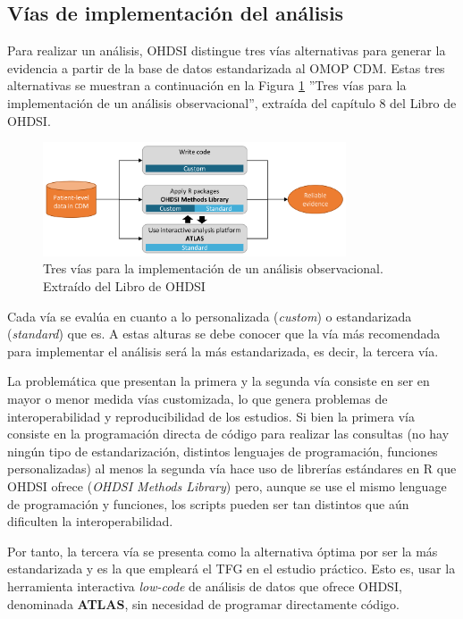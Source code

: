 \subsection{Vías de implementación del análisis} \label{subsec:05vias}

Para realizar un análisis, OHDSI distingue tres vías alternativas para generar la evidencia a partir de la base de datos estandarizada al OMOP CDM. Estas tres alternativas se muestran a continuación en la Figura \ref{fig:analysisImplementations} ''Tres vías para la implementación de un análisis observacional'', extraída del capítulo 8 del Libro de OHDSI.

\begin{figure}[H]
    \centering
    \includegraphics[width=0.80\textwidth]{figures/analysisImplementations.png}
     \caption{Tres vías para la implementación de un análisis observacional. Extraído del Libro de OHDSI \cite{OHDSIbook}}
    \label{fig:analysisImplementations}
\end{figure}

Cada vía se evalúa en cuanto a lo personalizada (\textit{custom}) o estandarizada (\textit{standard}) que es. A estas alturas se debe conocer que la vía más recomendada para implementar el análisis será la más estandarizada, es decir, la tercera vía.

La problemática que presentan la primera y la segunda vía consiste en ser en mayor o menor medida vías customizada, lo que genera problemas de interoperabilidad y reproducibilidad de los estudios. Si bien la primera vía consiste en la programación directa de código para realizar las consultas  (no hay ningún tipo de estandarización, distintos lenguajes de programación, funciones personalizadas) al menos la segunda vía hace uso de librerías estándares en R que OHDSI ofrece (\textit{OHDSI Methods Library}) pero, aunque se use el mismo lenguage de programación y funciones, los scripts pueden ser tan distintos que aún dificulten la interoperabilidad.

Por tanto, la tercera vía se presenta como la alternativa óptima por ser la más estandarizada y es la que empleará el TFG en el estudio práctico. Esto es, usar la herramienta interactiva \textit{low-code} de análisis de datos que ofrece OHDSI, denominada \textbf{ATLAS}, sin necesidad de programar directamente código.

